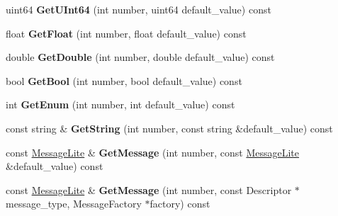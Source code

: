\begin{DoxyCompactItemize}
uint64 {\bfseries Get\+U\+Int64} (int number, uint64 default\+\_\+value) const
\item 
\mbox{\label{classgoogle_1_1protobuf_1_1internal_1_1ExtensionSet_a671a1e95f0fd16303c8ef8ae956230d3}} 
float {\bfseries Get\+Float} (int number, float default\+\_\+value) const
\item 
\mbox{\label{classgoogle_1_1protobuf_1_1internal_1_1ExtensionSet_aacdd88bba3c1083b15e67bf6d322058c}} 
double {\bfseries Get\+Double} (int number, double default\+\_\+value) const
\item 
\mbox{\label{classgoogle_1_1protobuf_1_1internal_1_1ExtensionSet_a9937380bf74e43e09f4b27da7a47d713}} 
bool {\bfseries Get\+Bool} (int number, bool default\+\_\+value) const
\item 
\mbox{\label{classgoogle_1_1protobuf_1_1internal_1_1ExtensionSet_a69b951ff3f189b2485fe964549811989}} 
int {\bfseries Get\+Enum} (int number, int default\+\_\+value) const
\item 
\mbox{\label{classgoogle_1_1protobuf_1_1internal_1_1ExtensionSet_aadf639c268e252411345aea1f7343ddb}} 
const string \& {\bfseries Get\+String} (int number, const string \&default\+\_\+value) const
\item 
\mbox{\label{classgoogle_1_1protobuf_1_1internal_1_1ExtensionSet_a2e863771980aaec7e5d054601971f45b}} 
const \hyperlink{classgoogle_1_1protobuf_1_1MessageLite}{Message\+Lite} \& {\bfseries Get\+Message} (int number, const \hyperlink{classgoogle_1_1protobuf_1_1MessageLite}{Message\+Lite} \&default\+\_\+value) const
\item 
\mbox{\label{classgoogle_1_1protobuf_1_1internal_1_1ExtensionSet_aa25c99940bc00c6140192b00a418b11b}} 
const \hyperlink{classgoogle_1_1protobuf_1_1MessageLite}{Message\+Lite} \& {\bfseries Get\+Message} (int number, const Descriptor $\ast$message\+\_\+type, Message\+Factory $\ast$factory) const

\end{DoxyCompactItemize}
